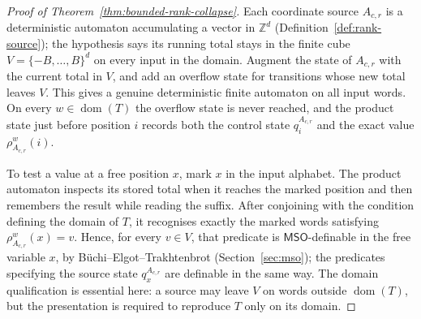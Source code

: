 \documentclass[11pt]{article}
\theoremstyle{definition}
\newcommand{\Z}{\mathbb Z}
\newcommand{\MSO}{\mathsf{MSO}}
\begin{document}
\begin{proof}[Proof of Theorem~\ref{thm:bounded-rank-collapse}]
Each coordinate source $A_{c,r}$ is a deterministic automaton accumulating a
vector in $\Z^d$ (Definition~\ref{def:rank-source}); the hypothesis says its running total
stays in the finite cube $V=\{-B,\ldots,B\}^d$ on every input in the domain.
Augment the state of $A_{c,r}$ with the current total in $V$, and add an overflow
state for transitions whose new total leaves $V$.  This gives a genuine
deterministic finite automaton on all input words.  On every
$w\in\operatorname{dom}(T)$ the overflow state is never reached, and the
product state just before position $i$ records both the control state
$q^{A_{c,r}}_i$ and the exact value $\rho_{A_{c,r}}^w(i)$.

To test a value at a free position $x$, mark $x$ in the input alphabet.  The
product automaton inspects its stored total when it reaches the marked
position and then remembers the result while reading the suffix.  After
conjoining with the condition defining the domain of $T$, it recognises exactly
the marked words satisfying $\rho_{A_{c,r}}^w(x)=v$.  Hence, for every $v\in V$, that
predicate is $\MSO$-definable in the free variable $x$, by
B\"uchi--Elgot--Trakhtenbrot (Section~\ref{sec:mso}); the predicates specifying
the source state $q^{A_{c,r}}_x$ are definable in the same way.  The domain
qualification is essential here: a source may leave $V$ on words outside
$\operatorname{dom}(T)$, but the presentation is required to reproduce $T$
only on its domain.


\end{proof}
\end{document}
